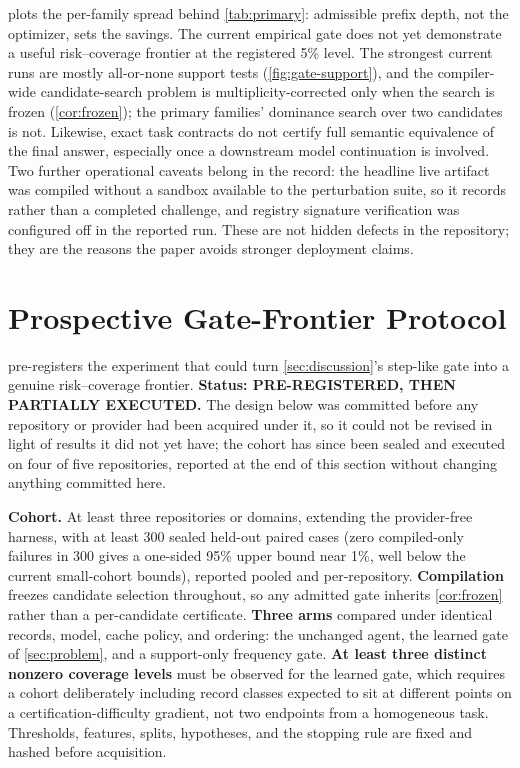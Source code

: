  plots the per-family spread behind
\cref{tab:primary}: admissible prefix depth, not the optimizer, sets the
savings. The current empirical gate does not yet demonstrate a useful
risk--coverage frontier at the registered 5\% level. The strongest current runs are mostly
all-or-none support tests (\cref{fig:gate-support}), and the compiler-wide
candidate-search problem is multiplicity-corrected only when the search is
frozen (\cref{cor:frozen}); the primary families' dominance search over two
candidates is not. Likewise, exact task
contracts do not certify full semantic equivalence of the final answer,
especially once a downstream model continuation is involved. Two further
operational caveats belong in the record: the headline live artifact was
compiled without a sandbox available to the perturbation suite, so it records
 rather than a completed challenge, and
registry signature verification was configured off in the reported run. These
are not hidden defects in the repository; they are the reasons the paper avoids
stronger deployment claims.

\section{Prospective Gate-Frontier Protocol}
\label{app:prospective}

 pre-registers
the experiment that could turn \cref{sec:discussion}'s step-like gate into a
genuine risk--coverage frontier. \textbf{Status: PRE-REGISTERED, THEN
PARTIALLY EXECUTED.} The design below was committed before any repository or
provider had been acquired under it, so it could not be revised in light of
results it did not yet have; the cohort has since been sealed and executed on
four of five repositories, reported at the end of this section without
changing anything committed here.

\textbf{Cohort.} At least three repositories or domains, extending the
provider-free  harness, with at least 300
sealed held-out paired cases (zero compiled-only failures in 300 gives a
one-sided 95\% upper bound near 1\%, well below the current small-cohort
bounds), reported pooled and per-repository. \textbf{Compilation} freezes
candidate selection throughout, so any admitted gate inherits
\cref{cor:frozen} rather than a per-candidate certificate. \textbf{Three arms}
compared under identical records, model, cache policy, and ordering: the
unchanged agent, the learned gate of \cref{sec:problem}, and a support-only
frequency gate. \textbf{At least three distinct nonzero coverage levels} must
be observed for the learned gate, which requires a cohort deliberately
including record classes expected to sit at different points on a
certification-difficulty gradient, not two endpoints from a homogeneous task.
Thresholds, features, splits, hypotheses, and the stopping rule are fixed and
hashed before acquisition.

